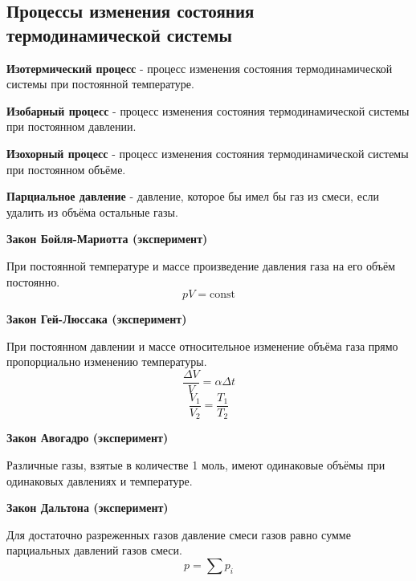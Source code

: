 \subsection{Процессы изменения состояния термодинамической системы}
\textbf{Изотермический процесс} - процесс изменения состояния термодинамической системы при постоянной температуре.\par
\textbf{Изобарный процесс} - процесс изменения состояния термодинамической системы при постоянном давлении.\par
\textbf{Изохорный процесс} - процесс изменения состояния термодинамической системы при постоянном объёме.\par
\textbf{Парциальное давление} - давление, которое бы имел бы газ из смеси, если удалить из объёма остальные газы.\par
\begin{oframed}
\textbf{Закон Бойля-Мариотта (эксперимент)}\par
При постоянной температуре и массе произведение давления газа на его объём постоянно.
\[pV=\text{const}\]
\end{oframed}
\begin{oframed}
\textbf{Закон Гей-Люссака (эксперимент)}\par
При постоянном давлении и массе относительное изменение объёма газа прямо пропорциально изменению температуры.
\[\frac{\Delta V}{V}=\alpha \Delta t\]
\[\frac{V_1}{V_2}=\frac{T_1}{T_2}\]
\end{oframed}
\begin{oframed}
\textbf{Закон Авогадро (эксперимент)}\par
Различные газы, взятые в количестве 1 моль, имеют одинаковые объёмы при одинаковых давлениях и температуре.
\end{oframed}
\begin{oframed}
\textbf{Закон Дальтона (эксперимент)}\par
Для достаточно разреженных газов давление смеси газов равно сумме парциальных давлений газов смеси.
\[p=\sum p_i\]
\end{oframed}



